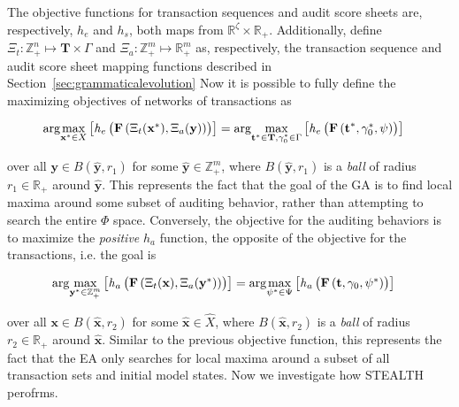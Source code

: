 
The objective functions for transaction sequences and audit score
sheets are, respectively, $h_e$ and $h_s$, both maps from
$\mathbb{R}^{\zeta} \times \mathbb{R}_+$. Additionally, define
$\Xi_t:\mathbb{Z}_+^n \mapsto \textbf{T} \times \Gamma$ and
$\Xi_a:\mathbb{Z}_+^m \mapsto \mathbb{R}_+^m$ as, respectively, the
transaction sequence and audit score sheet mapping functions described
in Section~\ref{sec:grammaticalevolution} Now it is possible to fully
define the maximizing objectives of networks of transactions as

\begin{align*}
\arg\!\max_{\textbf{x}^* \in X} \left[
\text{\textit{h}}_e \left(\begin{matrix}
  \textbf{F}\left(\Xi_t(\textbf{x}^*), \Xi_a(\textbf{y}) \right)
 \end{matrix}\right)\right] &=
\arg\!\max_{\textbf{t}^* \in \textbf{T}, \gamma_0^* \in \Gamma}
\left[\text{\textit{h}}_e \left(\begin{matrix}
    \textbf{F}\left(\textbf{t}^*, \gamma_0^*, \psi \right)
\end{matrix}\right)\right] &
\end{align*}

over all $\textbf{y} \in B(\hat{\textbf{y}},r_1)$ for some
$\hat{\textbf{y}} \in \mathbb{Z}_+^m$, where $B(\hat{\textbf{y}},r_1)$
is a \textit{ball} of radius $r_1 \in \mathbb{R}_+$ around
$\hat{\textbf{y}}$. This represents the fact that the goal of the GA
is to find local maxima around some subset of auditing behavior,
rather than attempting to search the entire $\Phi$ space. Conversely,
the objective for the auditing behaviors is to maximize the
\textit{positive} $h_a$ function, the opposite of the objective for
the transactions, i.e. the goal is

\begin{align*}
\arg\!\max_{\textbf{y}^* \in \mathbb{Z}_+^m} \left[
\text{\textit{h}}_a \left(\begin{matrix} \textbf{F}\left(
  \Xi_t(\textbf{x}), \Xi_a(\textbf{y}^*)
  \right)\end{matrix}\right)\right] &= 
  \arg\!\max_{\psi^* \in \Psi}
\left[\text{\textit{h}}_a \left(\begin{matrix}
    \textbf{F}\left(\textbf{t}, \gamma_0, \psi^* \right)
\end{matrix}\right)\right]
\end{align*}

over all $\textbf{x} \in B(\hat{\textbf{x}},r_2)$ for some
$\hat{\textbf{x}} \in \hat{X}$, where $B(\hat{\textbf{x}},r_2)$ is a
\textit{ball} of radius $r_2 \in \mathbb{R}_+$ around
$\hat{\textbf{x}}$. Similar to the previous objective function, this
represents the fact that the EA only searches for local maxima around
a subset of all transaction sets and initial model states. Now we
investigate how STEALTH perofrms.
